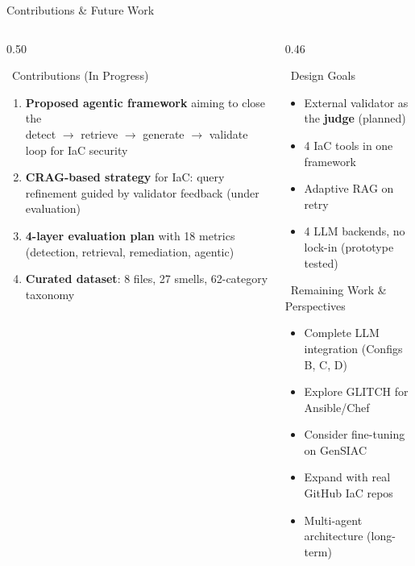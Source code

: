 \documentclass[aspectratio=169, 10pt]{beamer}
\begin{document}
\begin{frame}{Contributions \& Future Work}
  \begin{columns}[T]
    \begin{column}{0.50\textwidth}
      \begin{exampleblock}{\faStar\ Contributions (In Progress)}
        \begin{enumerate}
          \item \textbf{Proposed agentic framework} aiming to close the\\
            detect $\to$ retrieve $\to$ generate $\to$ validate loop for IaC security
          \item \textbf{CRAG-based strategy} for IaC: query refinement guided by validator feedback (under evaluation)
          \item \textbf{4-layer evaluation plan} with 18 metrics (detection, retrieval, remediation, agentic)
          \item \textbf{Curated dataset}: 8 files, 27 smells, 62-category taxonomy
        \end{enumerate}
      \end{exampleblock}
    \end{column}
    \begin{column}{0.46\textwidth}
      \begin{block}{\faRocket\ Design Goals}
        \begin{itemize}
          \item External validator as the \textbf{judge} (planned)
          \item 4 IaC tools in one framework
          \item Adaptive RAG on retry
          \item 4 LLM backends, no lock-in (prototype tested)
        \end{itemize}
      \end{block}
      \vspace{0.4em}
      \begin{alertblock}{\faArrowCircleRight\ Remaining Work \& Perspectives}
        \begin{itemize}
          \item Complete LLM integration (Configs B, C, D)
          \item Explore GLITCH for Ansible/Chef
          \item Consider fine-tuning on GenSIAC
          \item Expand with real GitHub IaC repos
          \item Multi-agent architecture (long-term)
        \end{itemize}
      \end{alertblock}
    \end{column}
  \end{columns}
\end{frame}
\end{document}
